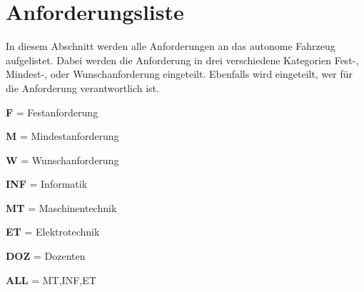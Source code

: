 \newpage
\section{Anforderungsliste}
\label{sec:anforderungsliste}

In diesem Abschnitt werden alle Anforderungen an das autonome Fahrzeug aufgelistet.
Dabei werden die Anforderung in drei verschiedene Kategorien Fest-, Mindest-, oder Wunschanforderung eingeteilt.
Ebenfalls wird eingeteilt, wer für die Anforderung verantwortlich ist.

\begin{multicols}{2}
\begin{items}
  \item {\bf F} = Festanforderung
  \item {\bf M} = Mindestanforderung
  \item {\bf W} = Wunschanforderung
\end{items}

\columnbreak

\begin{items}
  \item {\bf INF} = Informatik
  \item {\bf MT} = Maschinentechnik
  \item {\bf ET} = Elektrotechnik
  \item {\bf DOZ} = Dozenten
  \item {\bf ALL} = MT,INF,ET
\end{items}
\end{multicols}

